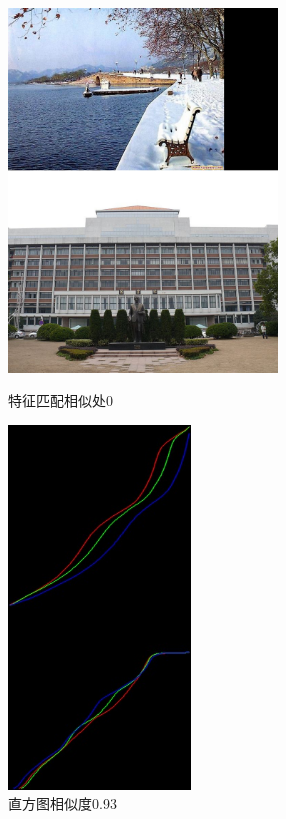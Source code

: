 \begin{figure}[htb]
\begin{minipage}[t]{0.5\linewidth}
\centering
\includegraphics[height=3.8in]{断桥.jpg.d/im5sift.jpg}
\caption{特征匹配相似处0}
\label{fig:side:a}
\end{minipage}%
\begin{minipage}[t]{0.5\linewidth}
\centering
\includegraphics[height=3.8in]{断桥.jpg.d/im5hist2.jpg}
\caption{直方图相似度0.93}
\label{fig:side:a}
\end{minipage}%
\end{figure}

\clearpage
